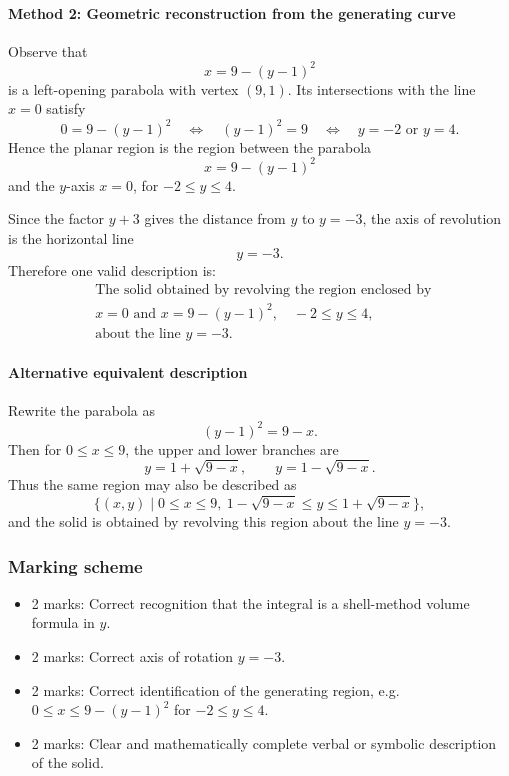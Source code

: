 \documentclass[12pt]{article}
\begin{document}
\paragraph{Method 2: Geometric reconstruction from the generating curve}
Observe that
\[
x=9-(y-1)^2
\]
is a left-opening parabola with vertex \((9,1)\). Its intersections with the line \(x=0\) satisfy
\[
0=9-(y-1)^2
\quad\Longleftrightarrow\quad
(y-1)^2=9
\quad\Longleftrightarrow\quad
y=-2 \text{ or } y=4.
\]
Hence the planar region is the region between the parabola
\[
x=9-(y-1)^2
\]
and the \(y\)-axis \(x=0\), for \(-2\le y\le 4\).

Since the factor \(y+3\) gives the distance from \(y\) to \(y=-3\), the axis of revolution is the horizontal line
\[
y=-3.
\]
Therefore one valid description is:
\[
\boxed{
\begin{aligned}
&\text{The solid obtained by revolving the region enclosed by }\\
&x=0 \text{ and } x=9-(y-1)^2,\quad -2\le y\le 4,\\
&\text{about the line }y=-3.
\end{aligned}
}
\]

\paragraph{Alternative equivalent description}
Rewrite the parabola as
\[
(y-1)^2=9-x.
\]
Then for \(0\le x\le 9\), the upper and lower branches are
\[
y=1+\sqrt{9-x},
\qquad
y=1-\sqrt{9-x}.
\]
Thus the same region may also be described as
\[
\{(x,y)\mid 0\le x\le 9,\ 1-\sqrt{9-x}\le y\le 1+\sqrt{9-x}\},
\]
and the solid is obtained by revolving this region about the line \(y=-3\).

\subsubsection{Marking scheme}
\begin{itemize}
\item 2 marks: Correct recognition that the integral is a shell-method volume formula in \(y\).
\item 2 marks: Correct axis of rotation \(y=-3\).
\item 2 marks: Correct identification of the generating region, e.g. \(0\le x\le 9-(y-1)^2\) for \(-2\le y\le 4\).
\item 2 marks: Clear and mathematically complete verbal or symbolic description of the solid.
\end{itemize}
\end{document}
